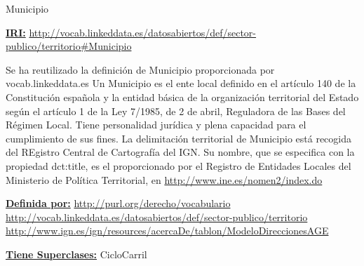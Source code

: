 \begin{mybox}{Municipio}
\begin{flushleft}
\underline{\textbf{IRI:}}
\url{http://vocab.linkeddata.es/datosabiertos/def/sector-publico/territorio#Municipio}
\newline

Se ha reutilizado la definición de Municipio proporcionada por vocab.linkeddata.es \cite{datoabiertos_municipio}
Un Municipio es el ente local definido en el artículo 140 de la Constitución española y la entidad básica de la organización territorial del Estado según el artículo 1 de la Ley 7/1985, de 2 de abril, Reguladora de las Bases del Régimen Local. Tiene personalidad jurídica y plena capacidad para el cumplimiento de sus fines. La delimitación territorial de Municipio está recogida del REgistro Central de Cartografía del IGN. Su nombre, que se especifica con la propiedad dct:title, es el proporcionado por el Registro de Entidades Locales del Ministerio de Política Territorial, en \url{http://www.ine.es/nomen2/index.do}
\newline


\underline{\textbf{Definida por:}}
\newline \url{http://purl.org/derecho/vocabulario}
\newline \url{http://vocab.linkeddata.es/datosabiertos/def/sector-publico/territorio}
\newline \url{http://www.ign.es/ign/resources/acercaDe/tablon/ModeloDireccionesAGE}
\newline

\underline{\textbf{Tiene Superclases:}}
\newline CicloCarril



\end{flushleft}
\end{mybox}






